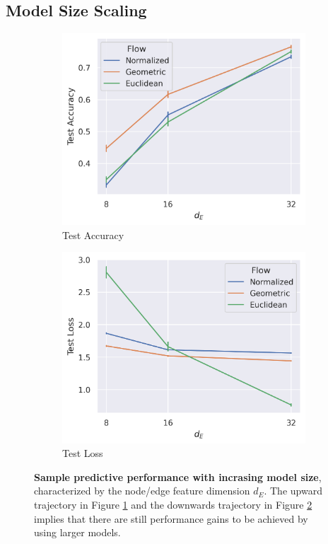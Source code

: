\subsection{Model Size Scaling} \label{sec:scaling}

\begin{figure}[t!]
    \centering
    \begin{subfigure}{0.47\linewidth}
        \centering
        \includegraphics[width=\linewidth]{figures/mnist/mnist_d_E_acc.png}
        \caption{\label{scale_acc}Test Accuracy}
    \end{subfigure}
    \begin{subfigure}{0.47\linewidth}
        \centering
        \includegraphics[width=\linewidth]{figures/mnist/mnist_d_E_loss.png}
        \caption{\label{scale_loss}Test Loss}
    \end{subfigure}
    \caption{\label{fig:scaling}\textbf{Sample predictive performance with incrasing model size}, characterized by the node/edge feature dimension $d_E$. The upward trajectory in Figure \ref{scale_acc} and the downwards trajectory in Figure \ref{scale_loss} implies that there are still performance gains to be achieved by using larger models.} 
\end{figure}

